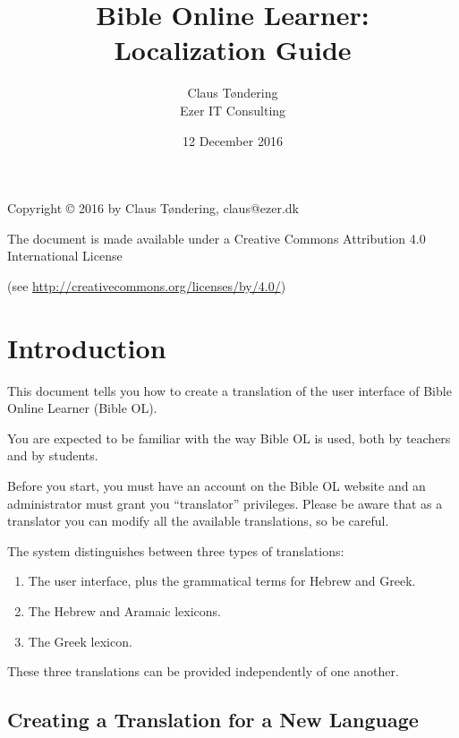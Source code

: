\documentclass[11pt,oneside,a4paper]{memoir}
\title{Bible Online Learner:\\Localization Guide}
\author{Claus Tøndering\\Ezer IT Consulting}
\date{12 December 2016}
\begin{document}
\begin{titlingpage*}
\maketitle

\begin{center}
Copyright © 2016 by Claus Tøndering, claus@ezer.dk

\vspace{5mm}

The document is made available under a Creative Commons Attribution 4.0 International License

(see \url{http://creativecommons.org/licenses/by/4.0/})
\end{center}
\end{titlingpage*}


\clearpage
\tableofcontents
{} %

\chapter{Introduction}

This document tells you how to create a translation of the user interface of Bible Online Learner
(Bible OL).

You are expected to be familiar with the way Bible OL is used, both by teachers and by students.

Before you start, you must have an account on the Bible OL website and an administrator must grant
you ``translator'' privileges. Please be aware that as a translator you can modify all the available
translations, so be careful.

The system distinguishes between three types of translations:

\begin{enumerate}
\item The user interface, plus the grammatical terms for Hebrew and Greek.
\item The Hebrew and Aramaic lexicons.
\item The Greek lexicon.
\end{enumerate}

These three translations can be provided independently of one another.


\section{Creating a Translation for a New Language}
\end{document}
